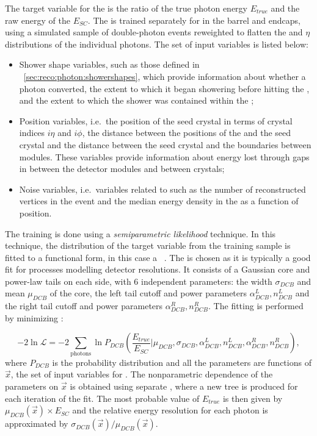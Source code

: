 The target variable for the \PhoEnergyBdt is the ratio of the true photon energy $E_{true}$ and the raw energy of the \SC $E_{SC}$. The \PhoEnergyBdt is trained separately for \SC\s in the barrel and endcaps, using a simulated sample of double-photon events reweighted to flatten the \pT and $\eta$ distributions of the individual photons. The set of input variables is listed below:
\begin{itemize}
\item Shower shape variables, such as those defined in \Sec~\ref{sec:reco:photon:showershapes}, which provide information about whether a photon converted, the extent to which it began showering before hitting the \ECAL, and the extent to which the shower was contained within the \ECAL;
\item Position variables, i.e.~the position of the seed crystal in terms of crystal indices $i\eta$ and $i\phi$, the distance between the positions of the \SC and the seed crystal and the distance between the seed crystal and the boundaries between \ECAL modules. These variables provide information about energy lost through gaps in between the detector modules and between crystals; 
\item Noise variables, i.e.~variables related to \PU such as the number of reconstructed vertices in the event and the median energy density in the \ECAL as a function of position.
\end{itemize}

The training is done using a \emph{semiparametric likelihood} technique. In this technique, the distribution of the target variable from the training sample is fitted to a functional form, in this case a \DCB~\cite{CrystalBallFunction}. The \DCB is chosen as it is typically a good fit for processes modelling detector resolutions. It consists of a Gaussian core and power-law tails on each side, with 6 independent parameters: the width $\sigma_{DCB}$ and mean $\mu_{DCB}$ of the core, the left tail cutoff and power parameters $\alpha_{DCB}^{L},n_{DCB}^{L}$ and the right tail cutoff and power parameters $\alpha_{DCB}^{R},n_{DCB}^{R}$. The fitting is performed by minimizing \NLL:

\begin{equation}
\label{reco:eq:regression:dcb}
 - 2\ln \mathcal{L} = -2 \sum_{\textrm{photons}} \ln P_{DCB}( \frac{E_{true}}{E_{SC}} | \mu_{DCB}, \sigma_{DCB}, \alpha_{DCB}^{L},n_{DCB}^{L}, \alpha_{DCB}^{R},n_{DCB}^{R} ) , 
\end{equation}
 where $P_{DCB}$ is the \DCB probability distribution and all the \DCB parameters are functions of $\vec{x}$, the set of input variables for \PhoEnergyBdt. The nonparametric dependence of the \DCB parameters on $\vec{x}$ is obtained using separate \BDT\s, where a new tree is produced for each iteration of the \NLL fit. The most probable value of $E_{true}$ is then given by $\mu_{DCB}(\vec{x}) \times E_{SC}$ and the relative energy resolution for each photon is approximated by $\sigma_{DCB}(\vec{x}) / \mu_{DCB}(\vec{x})$.

